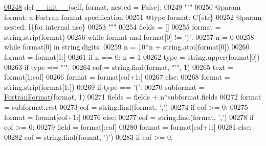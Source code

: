 \begin{DoxyCode}
\hypertarget{classpyneb_1_1utils_1_1_fortran_format_1_1_fortran_format_l00248}{}\hyperlink{classpyneb_1_1utils_1_1_fortran_format_1_1_fortran_format_a7fc0109f1fa73801ad3795463473e41a}{00248}     \textcolor{keyword}{def }\hyperlink{classpyneb_1_1utils_1_1_fortran_format_1_1_fortran_format_a7fc0109f1fa73801ad3795463473e41a}{\_\_init\_\_}(self, format, nested = False):
00249         \textcolor{stringliteral}{"""}
00250 \textcolor{stringliteral}{        @param format: a Fortran format specification}
00251 \textcolor{stringliteral}{        @type format: C\{str\}}
00252 \textcolor{stringliteral}{        @param nested: I\{for internal use\}}
00253 \textcolor{stringliteral}{        """}
00254         fields = []
00255         format = string.strip(format)
00256         \textcolor{keywordflow}{while} format \textcolor{keywordflow}{and} format[0] != \textcolor{stringliteral}{')'}:
00257             n = 0
00258             \textcolor{keywordflow}{while} format[0] \textcolor{keywordflow}{in} string.digits:
00259                 n = 10*n + string.atoi(format[0])
00260                 format = format[1:]
00261             \textcolor{keywordflow}{if} n == 0: n = 1
00262             type = string.upper(format[0])
00263             \textcolor{keywordflow}{if} type == \textcolor{stringliteral}{"'"}:
00264                 eof = string.find(format, \textcolor{stringliteral}{"'"}, 1)
00265                 text = format[1:eof]
00266                 format = format[eof+1:]
00267             \textcolor{keywordflow}{else}:
00268                 format = string.strip(format[1:])
00269             \textcolor{keywordflow}{if} type == \textcolor{stringliteral}{'('}:
00270                 subformat = \hyperlink{classpyneb_1_1utils_1_1_fortran_format_1_1_fortran_format}{FortranFormat}(format, 1)
00271                 fields = fields + n*subformat.fields
00272                 format = subformat.rest
00273                 eof = string.find(format, \textcolor{stringliteral}{','})
00274                 \textcolor{keywordflow}{if} eof >= 0:
00275                     format = format[eof+1:]
00276             \textcolor{keywordflow}{else}:
00277                 eof = string.find(format, \textcolor{stringliteral}{','})
00278                 \textcolor{keywordflow}{if} eof >= 0:
00279                     field = format[:eof]
00280                     format = format[eof+1:]
00281                 \textcolor{keywordflow}{else}:
00282                     eof = string.find(format, \textcolor{stringliteral}{')'})
00283                     \textcolor{keywordflow}{if} eof >= 0:

\end{DoxyCode}
